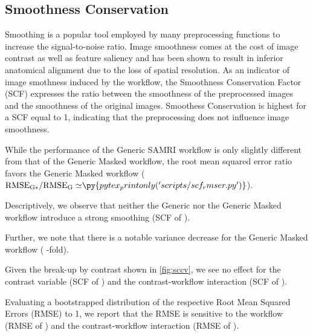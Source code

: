 \subsection{Smoothness Conservation}


Smoothing is a popular tool employed by many preprocessing functions to increase the signal-to-noise ratio.
Image smoothness comes at the cost of image contrast as well as feature saliency and has been shown to result in inferior anatomical alignment \cite{fmriprep} due to the loss of spatial resolution.
As an indicator of image smothness induced by the workflow, the Smoothness Conservation Factor (SCF) \cite{ioanas_optimized_2019} expresses the ratio between the smoothness of the preprocessed images and the smoothness of the original images.
Smoothess Conservation is highest for a SCF equal to 1, indicating that the preprocessing does not influence image smoothness.

While the performance of the Generic SAMRI workflow is only slightly different from that of the Generic Masked workflow, the root mean squared error ratio favors the Generic Masked workflow ($\mathrm{RMSE_{G*}/RMSE_{G}\simeq} \py{pytex_printonly('scripts/scf_rmser.py')}$).

Descriptively, we observe that neither the Generic nor the Generic Masked workflow introduce a strong smoothing (SCF of ).

Further, we note that there is a notable variance decrease for the Generic Masked workflow
(
-fold).

Given the break-up by contrast shown in \cref{fig:sccv}, we see no effect for the contrast variable
(SCF of )
and the contrast-workflow interaction
(SCF of ).

Evaluating a bootstrapped distribution of the respective Root Mean Squared Errors (RMSE) to 1, we report that the RMSE is sensitive to the
workflow (RMSE of )
and the contrast-workflow interaction (RMSE of ).

